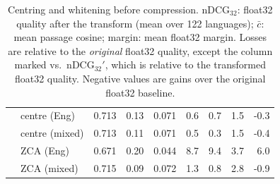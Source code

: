 \begin{table}[t]
\begin{tabular}{llrrrrrrr}
 & centre (Eng) & 0.713 & 0.13 & 0.071 & 0.6 & 0.7 & 1.5 & -0.3 \\
 & centre (mixed) & 0.713 & 0.11 & 0.071 & 0.5 & 0.3 & 1.5 & -0.4 \\
 & ZCA (Eng) & 0.671 & 0.20 & 0.044 & 8.7 & 9.4 & 3.7 & 6.0 \\
 & ZCA (mixed) & 0.715 & 0.09 & 0.072 & 1.3 & 0.8 & 2.8 & -0.9 \\
\bottomrule
\end{tabular}
\caption{Centring and whitening before compression. nDCG$_{32}$: float32 quality after the transform (mean over 122 languages); $\bar{c}$: mean passage cosine; margin: mean float32 margin. Losses are relative to the \emph{original} float32 quality, except the column marked vs.\ nDCG$_{32}'$, which is relative to the transformed float32 quality. Negative values are gains over the original float32 baseline.}\label{tab:whiten}
\end{table}
